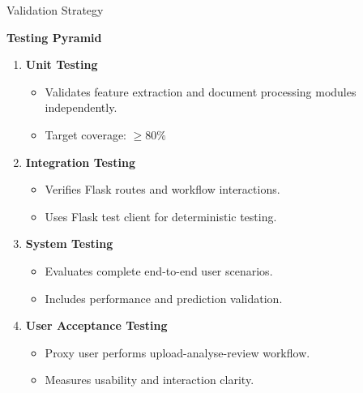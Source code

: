 \documentclass[compress,aspectratio=169]{beamer}
\begin{document}

\begin{frame}{Validation Strategy}
\begin{center}
\textbf{Testing Pyramid}
\end{center}

\vspace{0.3cm}

\begin{enumerate}
    \item \textbf{Unit Testing}
    \begin{itemize}
        \item Validates feature extraction and document processing modules independently.
        \item Target coverage: $\geq 80\%$
    \end{itemize}
    
    \vspace{0.2cm}
    
    \item \textbf{Integration Testing}
    \begin{itemize}
        \item Verifies Flask routes and workflow interactions.
        \item Uses Flask test client for deterministic testing.
    \end{itemize}
    
    \vspace{0.2cm}
    
    \item \textbf{System Testing}
    \begin{itemize}
        \item Evaluates complete end-to-end user scenarios.
        \item Includes performance and prediction validation.
    \end{itemize}
    
    \vspace{0.2cm}
    
    \item \textbf{User Acceptance Testing}
    \begin{itemize}
        \item Proxy user performs upload-analyse-review workflow.
        \item Measures usability and interaction clarity.
    \end{itemize}
\end{enumerate}
\end{frame}
\end{document}
